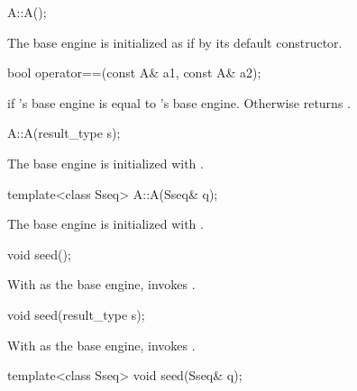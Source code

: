 \begin{itemdecl}
A::A();
\end{itemdecl}

\begin{itemdescr}
\pnum
\effects
 The base engine is initialized
 as if by its default constructor.
\end{itemdescr}

\begin{itemdecl}
bool operator==(const A& a1, const A& a2);
\end{itemdecl}

\begin{itemdescr}
\pnum
\returns
  if 's base engine is equal to 's base engine.
 Otherwise returns .
\end{itemdescr}

\begin{itemdecl}
A::A(result_type s);
\end{itemdecl}

\begin{itemdescr}
\pnum
\effects
 The base engine is initialized
 with .
\end{itemdescr}

\begin{itemdecl}
template<class Sseq> A::A(Sseq& q);
\end{itemdecl}

\begin{itemdescr}
\pnum
\effects
 The base engine is initialized
 with .
\end{itemdescr}

\begin{itemdecl}
void seed();
\end{itemdecl}

\begin{itemdescr}
\pnum
\effects
 With  as the base engine, invokes .
\end{itemdescr}

\begin{itemdecl}
void seed(result_type s);
\end{itemdecl}

\begin{itemdescr}
\pnum
\effects
 With  as the base engine, invokes .
\end{itemdescr}

\begin{itemdecl}
template<class Sseq> void seed(Sseq& q);
\end{itemdecl}

